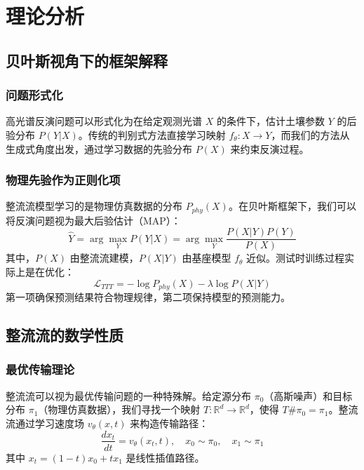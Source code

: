 \documentclass[12pt, a4paper]{article}
\begin{document}
\newpage
\section{理论分析}

\subsection{贝叶斯视角下的框架解释}

\subsubsection{问题形式化}
高光谱反演问题可以形式化为在给定观测光谱 $X$ 的条件下，估计土壤参数 $Y$ 的后验分布 $P(Y|X)$。传统的判别式方法直接学习映射 $f_\theta: X \rightarrow Y$，而我们的方法从生成式角度出发，通过学习数据的先验分布 $P(X)$ 来约束反演过程。

\subsubsection{物理先验作为正则化项}
整流流模型学习的是物理仿真数据的分布 $P_{phy}(X)$。在贝叶斯框架下，我们可以将反演问题视为最大后验估计（MAP）：
\begin{equation}
\hat{Y} = \arg\max_Y P(Y|X) = \arg\max_Y \frac{P(X|Y)P(Y)}{P(X)}
\end{equation}
其中，$P(X)$ 由整流流建模，$P(X|Y)$ 由基座模型 $f_\theta$ 近似。测试时训练过程实际上是在优化：
\begin{equation}
\mathcal{L}_{TTT} = -\log P_{phy}(X) - \lambda \log P(X|Y)
\end{equation}
第一项确保预测结果符合物理规律，第二项保持模型的预测能力。

\subsection{整流流的数学性质}

\subsubsection{最优传输理论}
整流流可以视为最优传输问题的一种特殊解。给定源分布 $\pi_0$（高斯噪声）和目标分布 $\pi_1$（物理仿真数据），我们寻找一个映射 $T: \mathbb{R}^d \rightarrow \mathbb{R}^d$，使得 $T\#\pi_0 = \pi_1$。整流流通过学习速度场 $v_\theta(x,t)$ 来构造传输路径：
\begin{equation}
\frac{dx_t}{dt} = v_\theta(x_t, t), \quad x_0 \sim \pi_0, \quad x_1 \sim \pi_1
\end{equation}
其中 $x_t = (1-t)x_0 + t x_1$ 是线性插值路径。
\end{document}
